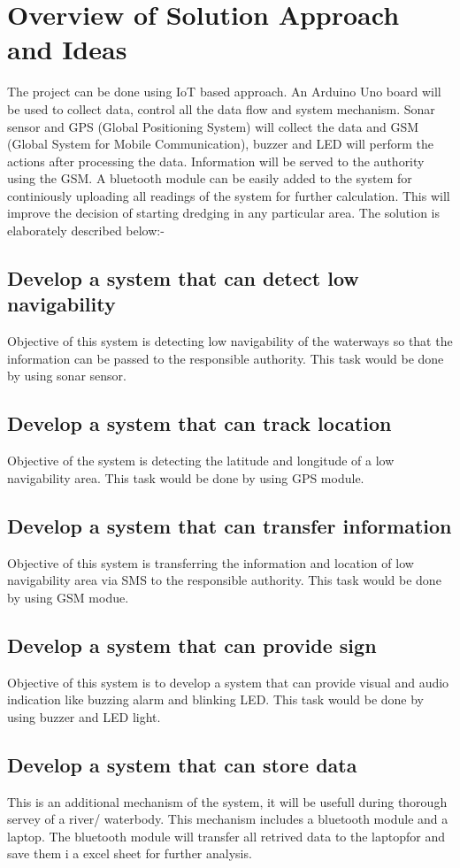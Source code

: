 \documentclass[12pt, top = 1 inch, bottom = 1 inch, left = 1.2 inch, top = .8 inch]{book}
\begin{document}
	\section{Overview of Solution Approach and Ideas}
	The project can be done using IoT based approach. An Arduino Uno board will be used to collect data, control all the data flow and system mechanism. Sonar sensor and GPS (Global Positioning System) will collect the data and GSM (Global System for Mobile Communication), buzzer and LED will perform the actions after processing the data. Information will be served to the authority using the GSM. A bluetooth module can be easily added to the system for continiously uploading all readings of the system for further calculation. This will improve the decision of starting dredging in any particular area. The solution is elaborately described below:-
	\subsection{Develop a system that can detect low navigability}
	Objective of this system is detecting low navigability of the waterways so that the information can be passed to the responsible authority. This task would be done by using sonar sensor.
	\subsection{Develop a system that can track location}
	Objective of the system is detecting the latitude and longitude of a low navigability area. This task would be done by using GPS module.
	\subsection{Develop a system that can transfer information}
	Objective of this system is transferring the information and location of low navigability area via SMS to the responsible authority. This task would be done by using GSM modue.
	\subsection{Develop a system that can provide sign}
	Objective of this system is to develop a system that can provide visual and audio indication like buzzing alarm and blinking LED. This task would be done by using buzzer and LED light.
	\subsection{Develop a system that can store data}
	This is an additional mechanism of the system, it will be usefull during thorough servey of a river/ waterbody. This mechanism includes a bluetooth module and  a laptop. The bluetooth module will transfer all retrived data to the laptopfor and save them i a excel sheet for further analysis.
\end{document}
